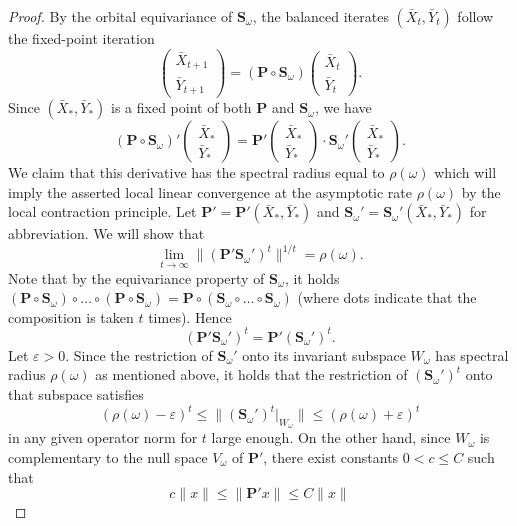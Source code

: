 \documentclass[a4paper]{article}
\newcommand{\bS}{\mathbf{S}}
\newcommand{\bP}{\mathbf{P}}
\theoremstyle{definition}
\numberwithin{equation}{section}
\begin{document}
\begin{proof}
By the orbital equivariance of $\bS_\omega$, the balanced iterates $(\bar X_t, \bar Y_t)$ follow the fixed-point iteration
\[
 \begin{pmatrix} \bar X_{t+1} \\ \bar Y_{t+1} \end{pmatrix} = (\bP \circ \bS_\omega)\!\begin{pmatrix} \bar X_t \\ \bar Y_t \end{pmatrix}.
\]
Since $(\bar X_*,\bar Y_*)$ is a fixed point of both $\bP$ and $\bS_\omega$, we have
\[
 (\bP \circ \bS_\omega)'\!\begin{pmatrix} \bar X_* \\ \bar Y_* \end{pmatrix} = \bP'\!\begin{pmatrix} \bar X_* \\ \bar Y_* \end{pmatrix} \cdot \bS_\omega'\!\begin{pmatrix} \bar X_* \\ \bar Y_*\end{pmatrix}.
\]
We claim that this derivative has the spectral radius equal to $\rho(\omega)$ which will imply the asserted local linear convergence at the asymptotic rate $\rho(\omega)$ by the local contraction principle. Let $\bP' = \bP'(\bar X_*,\bar Y_*)$ and $\bS_\omega' = \bS_\omega'(\bar X_*,\bar Y_*)$ for abbreviation. We will show that
\begin{equation}\label{eq: spectral radius PS}
 \lim_{t \to \infty} \| (\bP' \bS_\omega')^t \|^{1/t} = \rho(\omega).
\end{equation}
Note that by the equivariance property of $\bS_\omega$, it holds $(\bP \circ \bS_\omega) \circ \dots \circ (\bP \circ \bS_\omega) = \bP \circ (\bS_\omega \circ \dots \circ \bS_\omega)$ (where dots indicate that the composition is taken $t$ times). Hence
\[
 (\bP' \bS_\omega')^t = \bP' (\bS_\omega')^t.
\]
Let $\varepsilon > 0$. Since the restriction of $\bS_\omega'$ onto its invariant subspace $W_\omega$ has spectral radius $\rho(\omega)$ as mentioned above, it holds that the restriction of $(\bS_\omega')^t$ onto that subspace satisfies
\[
 (\rho(\omega) - \varepsilon)^t \le \| (\bS_\omega')^t\rvert_{W_\omega} \| \le (\rho(\omega) + \varepsilon)^t
\]
in any given operator norm for $t$ large enough. On the other hand, since $W_\omega$ is complementary to the null space $V_\omega$ of $\bP'$, there exist constants $0 < c \le C$ such that
\[
 c\| x \| \le \| \bP' x \| \le C \| x \|
\]

\end{proof}
\end{document}
